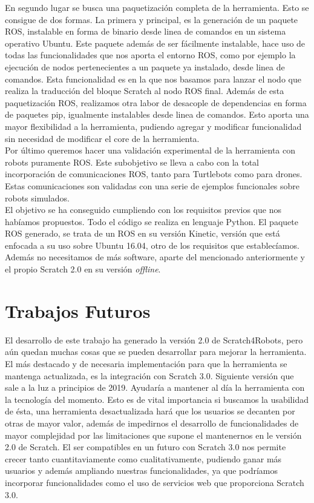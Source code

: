 En segundo lugar se busca una paquetización completa de la herramienta. Esto se consigue de dos formas. La primera y principal, es la generación de un paquete ROS, instalable en forma de binario desde linea de comandos en un sistema operativo Ubuntu. Este paquete además de ser fácilmente instalable, hace uso de todas las funcionalidades que nos aporta el entorno ROS, como por ejemplo la ejecución de nodos pertenecientes a un paquete ya instalado, desde linea de comandos. Esta funcionalidad es en la que nos basamos para lanzar el nodo que realiza la traducción del bloque Scratch al nodo ROS final. Además de esta paquetización ROS, realizamos otra labor de desacople de dependencias en forma de paquetes pip, igualmente instalables desde linea de comandos. Esto aporta una mayor flexibilidad a la herramienta, pudiendo agregar y modificar funcionalidad sin necesidad de modificar el core de la herramienta.\\

Por último queremos hacer una validación experimental de la herramienta con robots puramente ROS. Este subobjetivo se lleva a cabo con la total incorporación de comunicaciones ROS, tanto para Turtlebots como para drones. Estas comunicaciones son validadas con una serie de ejemplos funcionales sobre robots simulados.\\

El objetivo se ha conseguido cumpliendo con los requisitos previos que nos habíamos propuestos. Todo el código se realiza en lenguaje Python. El paquete ROS generado, se trata de un ROS en su versión Kinetic, versión que está enfocada a su uso sobre Ubuntu 16.04, otro de los requisitos que establecíamos. Además no necesitamos de más software, aparte del mencionado anteriormente y el propio Scratch 2.0 en su versión \textit{offline}.


\section{Trabajos Futuros}
\label{sec:trabajos-futuros}

El desarrollo de este trabajo ha generado la versión 2.0 de Scratch4Robots, pero aún quedan muchas cosas que se pueden desarrollar para mejorar la herramienta.\\

El más destacado y de necesaria implementación para que la herramienta se mantenga actualizada, es la integración con Scratch 3.0. Siguiente versión que sale a la luz a principios de 2019. Ayudaría a mantener al día la herramienta con la tecnología del momento. Esto es de vital importancia si buscamos la usabilidad de ésta, una herramienta desactualizada hará que los usuarios se decanten por otras de mayor valor, además de impedirnos el desarrollo de funcionalidades de mayor complejidad por las limitaciones que supone el mantenernos en le versión 2.0 de Scratch. El ser compatibles en un futuro con Scratch 3.0 nos permite crecer tanto cuantitaviamente como cualitativamente, pudiendo ganar más usuarios y además ampliando nuestras funcionalidades, ya que podríamos incorporar funcionalidades como el uso de servicios web que proporciona Scratch 3.0. \\

